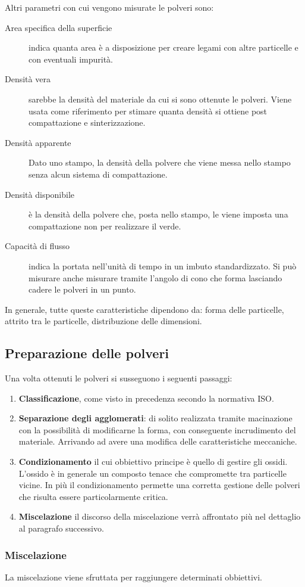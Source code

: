 Altri parametri con cui vengono misurate le polveri sono:
\begin{description}
\item[Area specifica della superficie] indica quanta area è a disposizione per creare legami con altre particelle e con eventuali impurità.
\item[Densità vera] sarebbe la densità del materiale da cui si sono ottenute le polveri.
Viene usata come riferimento per stimare quanta densità si ottiene post compattazione e sinterizzazione.
\item[Densità apparente] Dato uno stampo, la densità della polvere che viene messa nello stampo senza alcun sistema di compattazione.
\item[Densità disponibile] è la densità della polvere che, posta nello stampo, le viene imposta una compattazione non per realizzare il verde.
\item[Capacità di flusso] indica la portata nell'unità di tempo in un imbuto standardizzato.
Si può misurare anche misurare tramite l'angolo di cono che forma lasciando cadere le polveri in un punto.
\end{description}

In generale, tutte queste caratteristiche dipendono da: forma delle particelle, attrito tra le particelle, distribuzione delle dimensioni.

\subsection{Preparazione delle polveri}
Una volta ottenuti le polveri si susseguono i seguenti passaggi:
\begin{enumerate}
\item \textbf{Classificazione}, come visto in precedenza secondo la normativa ISO.
\item \textbf{Separazione degli agglomerati}: di solito realizzata tramite macinazione con la possibilità di modificarne la forma, con conseguente incrudimento del materiale. Arrivando ad avere una modifica delle caratteristiche meccaniche.
\item \textbf{Condizionamento} il cui obbiettivo principe è quello di gestire gli ossidi.
L'ossido è in generale un composto tenace che compromette tra particelle vicine.
In più il condizionamento permette una corretta gestione delle polveri che risulta essere particolarmente critica.
\item \textbf{Miscelazione} il discorso della miscelazione verrà affrontato più nel dettaglio al paragrafo successivo.
\end{enumerate}

\subsubsection{Miscelazione}
La miscelazione viene sfruttata per raggiungere determinati obbiettivi.\
